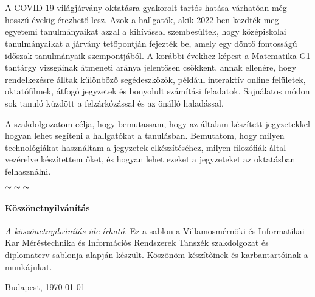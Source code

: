 \chapter*{\eloszo}

A COVID-19 világjárvány oktatásra gyakorolt tartós hatása várhatóan még hosszú
évekig érezhető lesz. Azok a hallgatók, akik 2022-ben kezdték meg egyetemi
tanulmányaikat azzal a kihívással szembesültek, hogy középiskolai tanulmányaikat
a járvány tetőpontján fejezték be, amely egy döntő fontosságú időszak
tanulmányaik szempontjából. A korábbi évekhez képest a Matematika G1
tantárgy vizsgáinak átmeneti aránya jelentősen csökkent, annak ellenére,
hogy rendelkezésre álltak különböző segédeszközök, például interaktív online
felületek, oktatófilmek, átfogó jegyzetek és bonyolult számítási feladatok.
Sajnálatos módon sok tanuló küzdött a felzárkózással és az önálló haladással.

A szakdolgozatom célja, hogy bemutassam, hogy az általam készített jegyzetekkel
hogyan lehet segíteni a hallgatókat a tanulásban. Bemutatom, hogy milyen
technológiákat használtam a jegyzetek elkészítéséhez, milyen filozófiák
által vezérelve készítettem őket, és hogyan lehet ezeket a jegyzeteket
az oktatásban felhasználni.


\begin{center}
  $\thicksim \; \thicksim \; \thicksim$
\end{center}

\subsubsection*{Köszönetnyilvánítás}
\emph{A köszönetnyilvánítás ide írható.} Ez a sablon a Villamosmérnöki és
Informatikai Kar Méréstechnika és Információs Rendszerek Tanszék szakdolgozat
és diplomaterv sablonja alapján készült. Köszönöm készítőinek és karbantartóinak
a munkájukat.

\vspace{0.5cm}

\begin{flushleft}
  {Budapest, \today}
\end{flushleft}

\begin{flushright}
  \emph{\authorName}
\end{flushright}

\vfill
